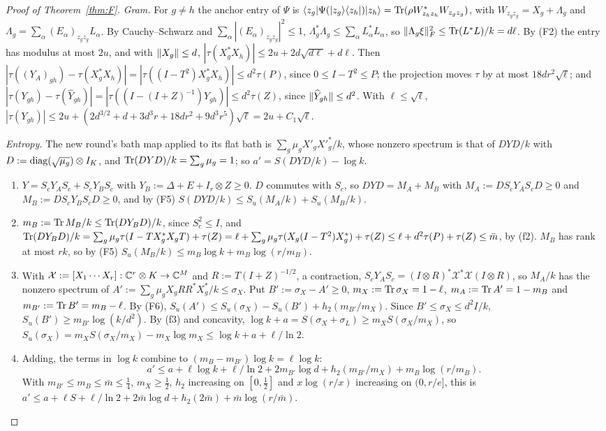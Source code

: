 \begin{proof}[Proof of Theorem~\ref{thm:F}]
\emph{Gram.} For $g\ne h$ the anchor entry of $\Psi$ is $\langle z_g\rvert\Psi(\lvert z_g\rangle\langle z_h\rvert)\lvert z_h\rangle=\operatorname{Tr}(\rho W_{z_hz_h}^*W_{z_gz_g})$, with $W_{z_gz_g}=X_g+\Lambda_g$ and
$\Lambda_g=\sum_\alpha(E_\alpha)_{z_gz_g}L_\alpha$. By Cauchy--Schwarz and $\sum_\alpha|(E_\alpha)_{z_gz_g}|^2\le1$, $\Lambda_g^*\Lambda_g\le\sum_\alpha L_\alpha^*L_\alpha$, so
$\lVert \Lambda_g\xi\rVert_F^2\le\operatorname{Tr}(L^*L)/k=d\ell$. By (F2) the entry has modulus at most $2u$, and with $\lVert X_g\rVert\le d$, $|\tau(X_g^*X_h)|\le2u+2d\sqrt{d\ell}+d\ell$. Then
$|\tau((Y_A)_{gh})-\tau(X_g^*X_h)|=|\tau((I-T^2)X_g^*X_h)|\le d^2\tau(P)$, since $0\le I-T^2\le P$; the projection moves $\tau$ by at most $18dr^2\sqrt\ell$; and
$|\tau(Y_{gh})-\tau(\widehat Y_{gh})|=|\tau((I-(I+Z)^{-1})\widehat Y_{gh})|\le d^2\tau(Z)$, since $\lVert \widehat Y_{gh}\rVert\le d^2$. With $\ell\le\sqrt\ell$,
$|\tau(Y_{gh})|\le2u+(2d^{3/2}+d+3d^3r+18dr^2+9d^3r^5)\sqrt\ell=2u+C_1\sqrt\ell$.

\emph{Entropy.} The new round's bath map applied to its flat bath is $\sum_g\mu_gX'_gX'^*_g/k$, whose nonzero spectrum is that of $DYD/k$ with
$D:=\operatorname{diag}(\sqrt{\mu_g})\otimes I_K$, and $\operatorname{Tr}(DYD)/k=\sum_g\mu_g=1$; so $a'=S(DYD/k)-\log k$.
\begin{enumerate}[label=\arabic*.,itemsep=1pt]
\item $Y=S_cY_AS_c+S_cY_BS_c$ with $Y_B:=\Delta+E+I_r\otimes Z\ge0$. $D$ commutes with $S_c$, so $DYD=M_A+M_B$ with $M_A:=DS_cY_AS_cD\ge0$ and
$M_B:=DS_cY_BS_cD\ge0$, and by (F5) $S(DYD/k)\le S_u(M_A/k)+S_u(M_B/k)$.
\item $m_B:=\operatorname{Tr} M_B/k\le\operatorname{Tr}(DY_BD)/k$, since $S_c^2\le I$, and $\operatorname{Tr}(DY_BD)/k=\sum_g\mu_g\tau(I-TX_g^*X_gT)+\tau(Z)=\ell+\sum_g\mu_g\tau(X_g(I-T^2)X_g^*)+\tau(Z)\le
\ell+d^2\tau(P)+\tau(Z)\le\bar m$, by (f2). $M_B$ has rank at most $rk$, so by (F5) $S_u(M_B/k)\le m_B\log k+m_B\log(r/m_B)$.
\item With $\mathcal X:=[X_1\cdots X_r]:\mathbb C^r\otimes K\to\mathbb C^M$ and $R:=T(I+Z)^{-1/2}$, a contraction, $S_cY_AS_c=(I\otimes R)^*\mathcal X^*\mathcal X(I\otimes R)$, so $M_A/k$ has
the nonzero spectrum of $A':=\sum_g\mu_gX_gRR^*X_g^*/k\le\sigma_X$. Put $B':=\sigma_X-A'\ge0$, $m_X:=\operatorname{Tr}\sigma_X=1-\ell$, $m_A:=\operatorname{Tr} A'=1-m_B$ and
$m_{B'}:=\operatorname{Tr} B'=m_B-\ell$. By (F6), $S_u(A')\le S_u(\sigma_X)-S_u(B')+h_2(m_{B'}/m_X)$. Since $B'\le\sigma_X\le d^2I/k$, $S_u(B')\ge m_{B'}\log(k/d^2)$. By (f3) and
concavity, $\log k+a=S(\sigma_X+\sigma_L)\ge m_XS(\sigma_X/m_X)$, so $S_u(\sigma_X)=m_XS(\sigma_X/m_X)-m_X\log m_X\le\log k+a+\ell/\ln2$.
\item Adding, the terms in $\log k$ combine to $(m_B-m_{B'})\log k=\ell\log k$:
\[
a'\le a+\ell\log k+\ell/\ln2+2m_{B'}\log d+h_2(m_{B'}/m_X)+m_B\log(r/m_B).
\]
With $m_{B'}\le m_B\le\bar m\le\frac14$, $m_X\ge\frac12$, $h_2$ increasing on $[0,\frac12]$ and $x\log(r/x)$ increasing on $(0,r/e]$, this is
$a'\le a+\ell S+\ell/\ln2+2\bar m\log d+h_2(2\bar m)+\bar m\log(r/\bar m)$.
\end{enumerate}


\end{proof}
